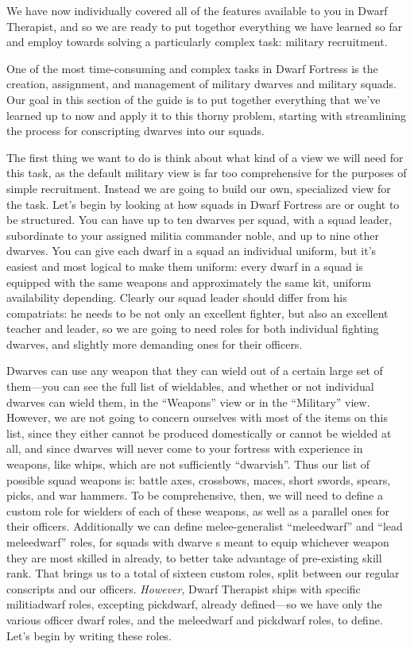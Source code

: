 \documentclass[]{article}
\begin{document}
We have now individually covered all of the features available to you in Dwarf Therapist, and so we are
ready to put togethor everything we have learned so far and employ towards solving a particularly
complex task: military recruitment.

One of the most time-consuming and complex tasks in Dwarf Fortress is the creation, assignment, and
management of military dwarves and military squads. Our goal in this section of the guide is to put
together everything that we've learned up to now and apply it to this thorny problem, starting with
streamlining the process for conscripting dwarves into our squads.

The first thing we want to do is think about what kind of a view we will need for this task, as the
default military view is far too comprehensive for the purposes of simple recruitment. Instead we are
going to build our own, specialized view for the task. Let's begin by looking at how squads in Dwarf
Fortress are or ought to be structured. You can have up to ten dwarves per squad, with a squad leader,
subordinate to your assigned militia commander noble, and up to nine other dwarves. You can give each
dwarf in a squad an individual uniform, but it's easiest and most logical to make them uniform: every
dwarf in a squad is equipped with the same weapons and approximately the same kit, uniform availability
depending. Clearly our squad leader should differ from his compatriats: he needs to be not only an
excellent fighter, but also an excellent teacher and leader, so we are going to need roles for both
individual fighting dwarves, and slightly more demanding ones for their officers.

Dwarves can use any weapon that they can wield out of a certain large set of them---you can see the full
list of wieldables, and whether or not individual dwarves can wield them, in the ``Weapons'' view or in
the ``Military'' view. However, we are not going to concern ourselves with most of the items on this
list, since they either cannot be produced domestically or cannot be wielded at all, and since dwarves
will never come to your fortress with experience in weapons, like whips, which are not
sufficiently ``dwarvish''. Thus our list of possible squad weapons is: battle axes, crossbows, maces,
short swords, spears, picks, and war hammers. To be comprehensive, then, we will need to define a custom
role for wielders of each of these weapons, as well as a parallel ones for their officers. Additionally
we can define melee-generalist ``meleedwarf'' and ``lead meleedwarf'' roles, for squads with dwarve s
meant to equip whichever weapon they are most skilled in already, to better take advantage of
pre-existing skill rank. That brings us to a total of sixteen custom roles, split between our regular
conscripts and our officers. \emph{However}, Dwarf Therapist ships with specific militiadwarf roles,
excepting pickdwarf, already defined---so we have only the various officer dwarf roles, and the
meleedwarf and pickdwarf roles, to define. Let's begin by writing these roles.
\end{document}

